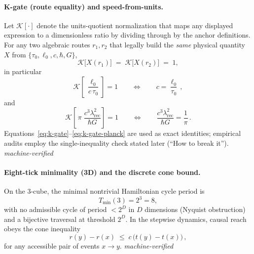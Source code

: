 \documentclass[12pt,a4paper]{article}
\begin{document}
\paragraph{K-gate (route equality) and speed-from-units.}
Let \(\mathcal{K}[\cdot]\) denote the units-quotient normalization that maps any displayed expression to a dimensionless ratio by dividing through by the anchor definitions. For any two algebraic routes \(r_1,r_2\) that legally build the \emph{same} physical quantity \(X\) from \(\{\tau_0,\ell_0,c,\hbar,G\}\),
\begin{equation}
  \mathcal{K}\!\big[X(r_1)\big] \;=\; \mathcal{K}\!\big[X(r_2)\big] \;=\; 1,
  \label{eq:k-gate}
\end{equation}
in particular
\begin{equation}
  \mathcal{K}\!\left[\,\frac{\ell_0}{c\,\tau_0}\right]=1
  \qquad\Longleftrightarrow\qquad
  c=\frac{\ell_0}{\tau_0}\,,
  \label{eq:speed-identity}
\end{equation}
and
\begin{equation}
  \mathcal{K}\!\left[\,\pi\;\frac{c^{3}\lambda_{\mathrm{rec}}^{2}}{\hbar G}\right]=1
  \qquad\Longleftrightarrow\qquad
  \frac{c^{3}\lambda_{\mathrm{rec}}^{2}}{\hbar G}=\frac{1}{\pi}\,.
  \label{eq:k-gate-planck}
\end{equation}
Equations~\eqref{eq:k-gate}–\eqref{eq:k-gate-planck} are used as exact identities; empirical audits employ the single-inequality check stated later (``How to break it'').
\hfill\emph{machine-verified}

\paragraph{Eight-tick minimality (3D) and the discrete cone bound.}
On the 3-cube, the minimal nontrivial Hamiltonian cycle period is
\begin{equation}
  T_{\min}(3)=2^{3}=8,
  \label{eq:eight-tick}
\end{equation}
with no admissible cycle of period \(<2^{D}\) in \(D\) dimensions (Nyquist obstruction) and a bijective traversal at threshold \(2^{D}\). In the stepwise dynamics, causal reach obeys the cone inequality
\begin{equation}
  r(y)-r(x)\;\le\; c\,\bigl(t(y)-t(x)\bigr)\,,
  \label{eq:cone}
\end{equation}
for any accessible pair of events \(x\to y\).
\hfill\emph{machine-verified}
\end{document}
